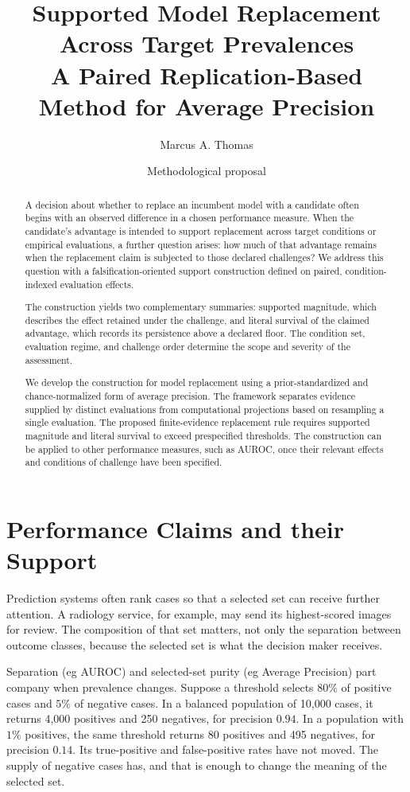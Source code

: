 \documentclass[11pt]{article}
\title{Supported Model Replacement Across Target Prevalences\\
\large A Paired Replication-Based Method for Average Precision}
\author{Marcus A. Thomas}
\date{Methodological proposal}
\theoremstyle{remark}
\begin{document}
\maketitle

\begin{abstract}
A decision about whether to replace an incumbent model with a candidate often begins with an observed difference in a chosen performance measure. When the candidate's advantage is intended to support replacement across target conditions or empirical evaluations, a further question arises: how much of that advantage remains when the replacement claim is subjected to those declared challenges? We address this question with a falsification-oriented support construction defined on paired, condition-indexed evaluation effects.

The construction yields two complementary summaries: supported magnitude, which describes the effect retained under the challenge, and literal survival of the claimed advantage, which records its persistence above a declared floor. The condition set, evaluation regime, and challenge order determine the scope and severity of the assessment.

We develop the construction for model replacement using a prior-standardized and chance-normalized form of average precision. The framework separates evidence supplied by distinct evaluations from computational projections based on resampling a single evaluation. The proposed finite-evidence replacement rule requires supported magnitude and literal survival to exceed prespecified thresholds. The construction can be applied to other performance measures, such as AUROC, once their relevant effects and conditions of challenge have been specified.
\end{abstract}


\section{Performance Claims and their Support}
\label{sec:introduction}

Prediction systems often rank cases so that a selected set can receive further
attention. A radiology service, for example, may send its highest-scored images
for review. The composition of that set matters, not only the separation
between outcome classes, because the selected set is what the decision maker
receives.

Separation (eg AUROC) and selected-set purity (eg Average Precision) part company when prevalence changes.
Suppose a threshold selects $80\%$ of positive cases and $5\%$ of negative
cases. In a balanced population of 10,000 cases, it returns 4,000 positives and
250 negatives, for precision $0.94$. In a population with $1\%$ positives, the
same threshold returns 80 positives and 495 negatives, for precision $0.14$.
Its true-positive and false-positive rates have not moved. The supply of
negative cases has, and that is enough to change the meaning of the selected
set.
\end{document}
